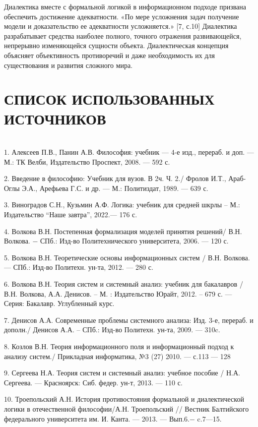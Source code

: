 \documentclass[a4paper,12pt]{report}
\begin{document}
Диалектика вместе с формальной логикой в информационном подходе призвана обеспечить достижение  адекватности. «По мере усложнения задач получение модели и доказательство ее адекватности усложняется.» [7, с.10] Диалектика разрабатывает средства наиболее полного, точного отражения развивающейся, непрерывно изменяющейся сущности объекта. Диалектическая концепция объясняет объективность противоречий и даже необходимость их для существования и развития сложного мира.












	\chapter*{СПИСОК ИСПОЛЬЗОВАННЫХ ИСТОЧНИКОВ} 
\\

1.  Алексеев П.В., Панин А.В. Философия: учебник —  4-е изд., перераб. и доп. —  М.: ТК Велби, Издательство Проспект, 2008. —  592 с.

2. Введение в философию: Учебник для вузов. В 2ч. Ч. 2./ Фролов И.Т., Араб-Оглы Э.А., Арефьева Г.С. и др. —  М.: Политиздат, 1989. —  639 с.

3. Виноградов С.Н., Кузьмин А.Ф. Логика: учебник для средней шкрлы – М.: Издательство “Наше завтра”, 2022.— 176 с.

4. Волкова В.Н. Постепенная формализация моделей принятия решений/ В.Н. Волкова. −  СПб.: Изд-во Политехнического университета, 2006. — 120 с.

5. Волкова В.Н. Теоретические основы информационных систем / В.Н. Волкова. — СПб.: Изд-во Политехн. ун-та, 2012. — 280 с.

6. Волкова В.Н. Теория систем и системный анализ: учебник для бакалавров /В.Н. Волкова, А.А. Денисов.  – М. : Издательство Юрайт, 2012. – 679 с. — Серия: Бакалавр. Углубленный курс.

7. Денисов А.А. Современные проблемы системного анализа: Изд. 3-е, перераб.  и дополн./ Денисов А.А. – СПб.: Изд-во Политехн. ун-та, 2009. — 310c.

8. Козлов В.Н. Теория информационного поля и информационный подход к анализу систем./ Прикладная информатика, №3 (27) 2010. —  с.113 — 128

9. Сергеева Н.А. Теория систем и системный анализ: учебное пособие / Н.А. Сергеева. —  Красноярск: Сиб. федер. ун-т, 2013. —  110 с.

10. Троепольский А.Н. История противостояния формальной и диалектической логики в отечественной философии/А.Н. Троепольский // Вестник Балтийского федерального университета им. И. Канта. —  2013. —  Вып.6.−  c.7—15.

    
    
    
   	
\end{document}
